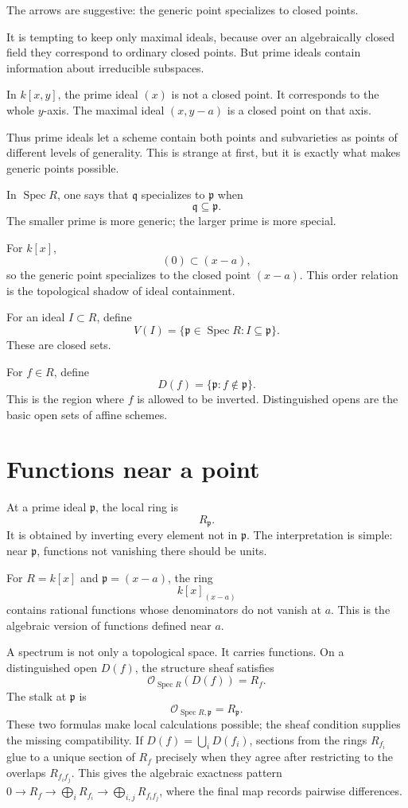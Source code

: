 The arrows are suggestive: the generic point specializes to closed points.

It is tempting to keep only maximal ideals, because over an algebraically closed field they correspond to ordinary closed points.  But prime ideals contain information about irreducible subspaces.

In \(k[x,y]\), the prime ideal \((x)\) is not a closed point.  It corresponds to the whole \(y\)-axis.  The maximal ideal \((x,y-a)\) is a closed point on that axis.

Thus prime ideals let a scheme contain both points and subvarieties as points of different levels of generality.  This is strange at first, but it is exactly what makes generic points possible.

In \(\operatorname{Spec}R\), one says that \(\mathfrak q\) specializes to \(\mathfrak p\) when
\[
  \mathfrak q\subseteq\mathfrak p.
\]
The smaller prime is more generic; the larger prime is more special.

For \(k[x]\),
\[
  (0)\subset (x-a),
\]
so the generic point specializes to the closed point \((x-a)\).  This order relation is the topological shadow of ideal containment.

For an ideal \(I\subset R\), define
\[
  V(I)=\{\mathfrak p\in\operatorname{Spec}R:I\subseteq\mathfrak p\}.
\]
These are closed sets.

For \(f\in R\), define
\[
  D(f)=\{\mathfrak p:f\notin\mathfrak p\}.
\]
This is the region where \(f\) is allowed to be inverted. Distinguished opens are the basic open sets of affine schemes.

\section{Functions near a point}

At a prime ideal \(\mathfrak p\), the local ring is
\[
  R_{\mathfrak p}.
\]
It is obtained by inverting every element not in \(\mathfrak p\). The interpretation is simple: near \(\mathfrak p\), functions not vanishing there should be units.

For \(R=k[x]\) and \(\mathfrak p=(x-a)\), the ring
\[
  k[x]_{(x-a)}
\]
contains rational functions whose denominators do not vanish at \(a\). This is the algebraic version of functions defined near \(a\).

A spectrum is not only a topological space. It carries functions. On a distinguished open \(D(f)\), the structure sheaf satisfies
\[
  \mathcal O_{\operatorname{Spec}R}(D(f))=R_f.
\]
The stalk at \(\mathfrak p\) is
\[
  \mathcal O_{\operatorname{Spec}R,\mathfrak p}=R_{\mathfrak p}.
\]
These two formulas make local calculations possible; the sheaf condition supplies the missing compatibility. If \(D(f)=\bigcup_iD(f_i)\), sections from the rings \(R_{f_i}\) glue to a unique section of \(R_f\) precisely when they agree after restricting to the overlaps \(R_{f_if_j}\). This gives the algebraic exactness pattern \(0\to R_f\to\bigoplus_iR_{f_i}\to\bigoplus_{i,j}R_{f_if_j}\), where the final map records pairwise differences.

